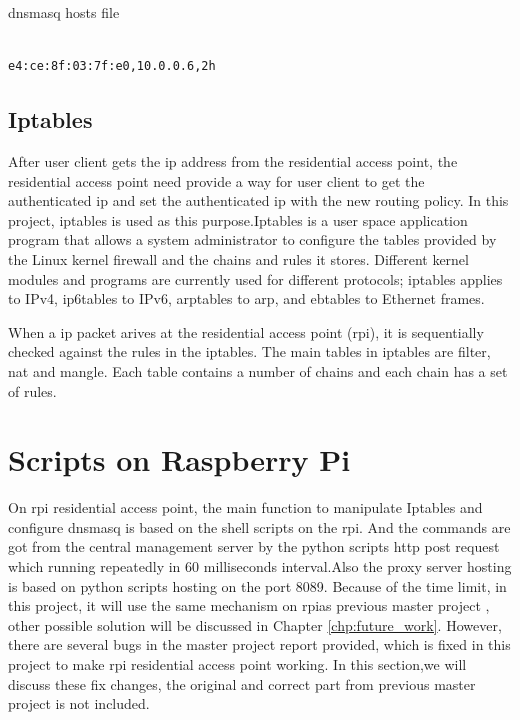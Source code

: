 \begin{algorithm}[h]
  \caption{dnsmasq hosts file}
  \label{code:dnsmasq_hosts}
  \begin{verbatim}
  
e4:ce:8f:03:7f:e0,10.0.0.6,2h
 \end{verbatim}
\end{algorithm}

\subsection{Iptables}
\par After user client gets the \gls{ip} address from the residential access point, the residential access point need provide a way for user client to get the authenticated \gls{ip} and set the authenticated \gls{ip} with the new routing policy. In this project, iptables\cite{iptables} is used as this purpose.Iptables is a user space application program that allows a system administrator to configure the tables provided by the Linux kernel firewall and the chains and rules it stores. Different kernel modules and programs are currently used for different protocols; iptables applies to IPv4, ip6tables to IPv6, arptables to \gls{arp}, and ebtables to Ethernet frames.
\par When a \gls{ip} packet arives at the residential access point (\gls{rpi}), it is sequentially checked against the rules in the iptables. The main tables in iptables are filter, nat and mangle. Each table contains a number of chains and each chain has a set of rules.

\section{Scripts on Raspberry Pi}
\label{sec:scripts_rpi}
\par On \gls{rpi} residential access point, the main function to manipulate Iptables and configure dnsmasq is based on the shell scripts on the \gls{rpi}. And the commands are got from the central management server by the python scripts \gls{http} post request which running repeatedly in 60 milliseconds interval.Also the proxy server hosting is based on python scripts hosting on the port 8089. Because of the time limit, in this project, it will use the same mechanism on \gls{rpi}as previous master project \cite{TorgeirMR}, other possible solution will be discussed in Chapter \ref{chp:future_work}. However, there are several bugs in the master project report provided, which is fixed in this project to make \gls{rpi} residential access point working. In this section,we will discuss these fix changes, the original and correct part from previous master project is not included.
